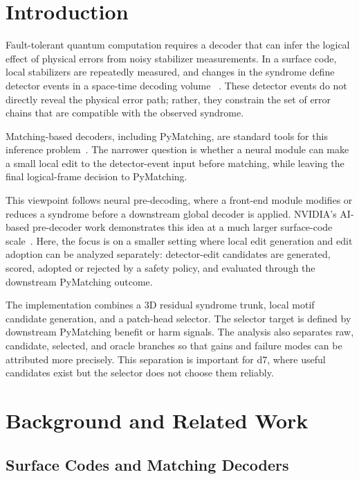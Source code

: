 \documentclass[aps,prd,12pt,twocolumn,superscriptaddress,floatfix,longbibliography]{revtex4-2}
\begin{document}
\section{Introduction}

Fault-tolerant quantum computation requires a decoder that can infer the
logical effect of physical errors from noisy stabilizer measurements. In a
surface code, local stabilizers are repeatedly measured, and changes in the
syndrome define detector events in a space-time decoding volume
~\cite{surfacecode}. These detector events do not directly reveal the physical
error path; rather, they constrain the set of error chains that are compatible
with the observed syndrome.

Matching-based decoders, including PyMatching, are standard tools for this
inference problem~\cite{pymatching}. The narrower question is whether a neural
module can make a small local edit to the detector-event input before
matching, while leaving the final logical-frame decision to PyMatching.

This viewpoint follows neural pre-decoding, where a front-end module modifies
or reduces a syndrome before a downstream global decoder is applied. NVIDIA's
AI-based pre-decoder work demonstrates this idea at a much larger surface-code
scale~\cite{nvidiaising}. Here, the focus is on a smaller setting where local
edit generation and edit adoption can be analyzed separately: detector-edit
candidates are generated, scored, adopted or rejected by a safety policy, and
evaluated through the downstream PyMatching outcome.

The implementation combines a 3D residual syndrome trunk, local motif candidate
generation, and a patch-head selector. The selector target is defined by
downstream PyMatching benefit or harm signals. The analysis also separates raw,
candidate, selected, and oracle branches so that gains and failure modes can be
attributed more precisely. This separation is important for d7, where useful
candidates exist but the selector does not choose them reliably.

\section{Background and Related Work}

\subsection{Surface Codes and Matching Decoders}
\end{document}
